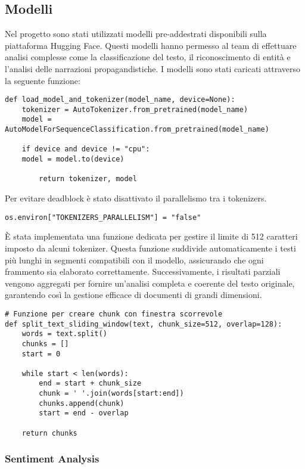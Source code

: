 \documentclass[12pt]{article}
\begin{document}
	\subsection{Modelli}
	
	Nel progetto sono stati utilizzati modelli pre-addestrati disponibili sulla piattaforma Hugging Face. Questi modelli hanno permesso al team di effettuare analisi complesse come la classificazione del testo, il riconoscimento di entità e l'analisi delle narrazioni propagandistiche.
	I modelli sono stati caricati attraverso la seguente funzione:
	\begin{lstlisting}
def load_model_and_tokenizer(model_name, device=None):
	tokenizer = AutoTokenizer.from_pretrained(model_name)
	model = AutoModelForSequenceClassification.from_pretrained(model_name)
		
	if device and device != "cpu":
	model = model.to(device)
		
		return tokenizer, model
	\end{lstlisting}
	Per evitare deadblock è stato disattivato il parallelismo tra i tokenizers.
	\begin{lstlisting}
os.environ["TOKENIZERS_PARALLELISM"] = "false"
	\end{lstlisting}

	È stata implementata una funzione dedicata per gestire il limite di 512 caratteri imposto da alcuni tokenizer. Questa funzione suddivide automaticamente i testi più lunghi in segmenti compatibili con il modello, assicurando che ogni frammento sia elaborato correttamente. Successivamente, i risultati parziali vengono aggregati per fornire un'analisi completa e coerente del testo originale, garantendo così la gestione efficace di documenti di grandi dimensioni.
	\begin{lstlisting}
# Funzione per creare chunk con finestra scorrevole
def split_text_sliding_window(text, chunk_size=512, overlap=128):
	words = text.split()
	chunks = []
	start = 0
	
	while start < len(words):
		end = start + chunk_size
		chunk = ' '.join(words[start:end])
		chunks.append(chunk)
		start = end - overlap

	return chunks
	\end{lstlisting}


\newpage

		\subsubsection{Sentiment Analysis}
	
\end{document}

